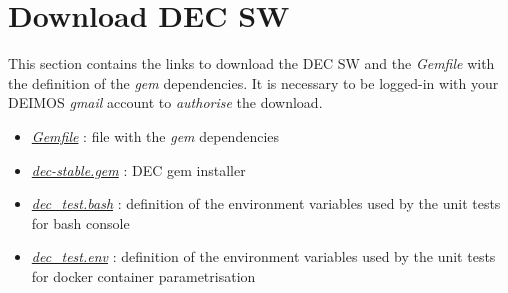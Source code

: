 \documentclass[dec_sum_main.tex]{subfiles}
\begin{document}
\section{Download DEC SW}
This section contains the links to download the DEC SW and the \textit{Gemfile} with the definition of the \textit{gem} dependencies. It is necessary to be logged-in with your DEIMOS \textit{gmail} account to \textit{authorise} the download.

\par
\noindent

\begin{itemize}
	\item \href{https://drive.google.com/uc?export=download&id=18TAD2BAJpHzgBdZGf3W8KQZCY7SPpKbU}{\textit{Gemfile}} : file with the \textit{gem} dependencies 
	\item \href{https://drive.google.com/uc?export=download&id=1gieDRpDEBzKv5Xr0qwPvBz34RHphTnQq}{\textit{dec-stable.gem}} : DEC gem installer
	\item\href{https://drive.google.com/uc?export=download&id=1JBAnxdRwaPK8PmrxuRi3qea43NOPRJbK/view?usp=sharing}{\textit{dec\_test.bash}} : definition of the environment variables used by the unit tests for bash console 
	\item\href{https://drive.google.com/uc?export=download&id=1HHWOVxCZbY6Surv_kKyF5kGTy45CvUKl/view?usp=sharing}{\textit{dec\_test.env}} : definition of the environment variables used by the unit tests for docker container parametrisation
\end{itemize}
\end{document}
